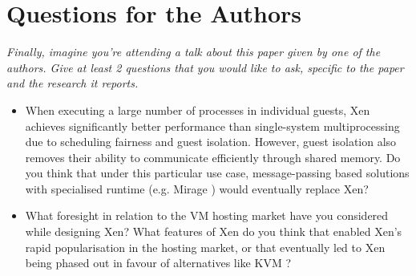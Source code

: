 \documentclass[11pt]{article}
\begin{document}
\section*{Questions for the Authors}
\textsl{Finally, imagine you're attending a talk about this paper given by one of the authors. Give at least 2 questions that you would like to ask, specific to the paper and the research it reports.}


\begin{itemize}
	\item When executing a large number of processes in individual guests, Xen achieves significantly better performance than single-system multiprocessing due to scheduling fairness and guest isolation. However, guest isolation also removes their ability to communicate efficiently through shared memory. Do you think that under this particular use case, message-passing based solutions with specialised runtime (e.g. Mirage \cite{madhavapeddy2013unikernels}) would eventually replace Xen?
	\item What foresight in relation to the VM hosting market have you considered while designing Xen? What features of Xen do you think that enabled Xen's rapid popularisation in the hosting market, or that eventually led to Xen being phased out in favour of alternatives like KVM \cite{kivity2007kvm}?
\end{itemize}


\footnotesize{}
\end{document}
